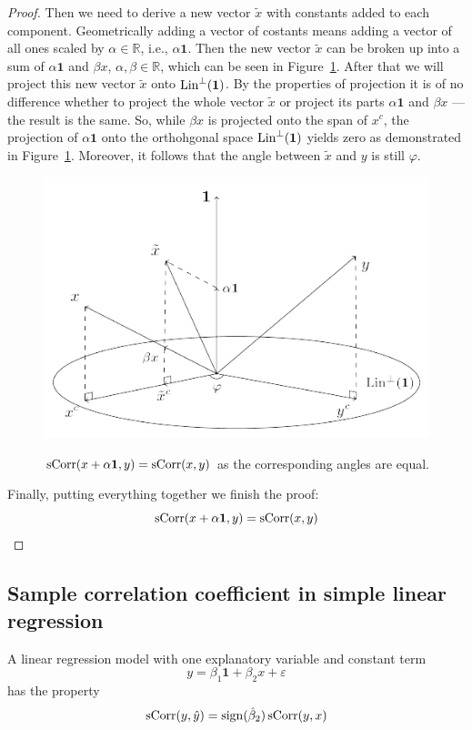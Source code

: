 \begin{proof}
Then we need to derive a new vector $\tilde x$ with constants added to each component.
Geometrically adding a vector of costants means adding a vector of all ones
scaled by $\alpha \in \mathbb{R}$, i.e., $\alpha \mathbf{1}$.
Then the new vector $\tilde x$ can be broken up into a sum of $\alpha \mathbf{1}$ and
$\beta x$, $\alpha, \beta \in \mathbb{R}$, which can be seen in Figure~\ref{fig:corr_final}.
After that we will project this new vector $\tilde x$ onto $\operatorname{Lin}^{\perp}(\mathbf{1})$.
By the properties of projection it is of no difference whether to project
the whole vector $\tilde x$ or project its parts $\alpha \mathbf{1}$
and $\beta x$ — the result is the same.
So, while $\beta x$ is projected onto the span of $x^c$, the projection of $\alpha \mathbf{1}$
onto the orthohgonal space $\operatorname{Lin}^{\perp}(\mathbf{1})$ yields zero as demonstrated
in Figure~\ref{fig:corr_final}.
Moreover, it follows that the angle between $\tilde x$ and $y$ is still $\varphi$.

\begin{figure}
\begin{center}
\includegraphics[width=0.6\linewidth]{figures/02_correlation_constant_proof.pdf}
\label{fig:corr_final}
\caption{$\operatorname{sCorr}(x + \alpha \mathbf{1}, y) = \operatorname{sCorr}(x,y)$ as the corresponding angles are equal.}
\end{center}
\end{figure}


Finally, putting everything together we finish the proof:
\[
\operatorname{sCorr}(x + \alpha \mathbf{1}, y) = \operatorname{sCorr}(x,y)
\]
\end{proof}


\subsection{Sample correlation coefficient in simple linear regression}

\begin{theorem}
A linear regression model with one explanatory variable and constant term
\[
y = \beta_1 \mathbf{1} + \beta_2 x + \varepsilon
\]
has the property
\[
\operatorname{sCorr}(y, \hat y) = \operatorname{sign}(\hat \beta_2) \operatorname{sCorr}(y, x)
\]
\end{theorem}

